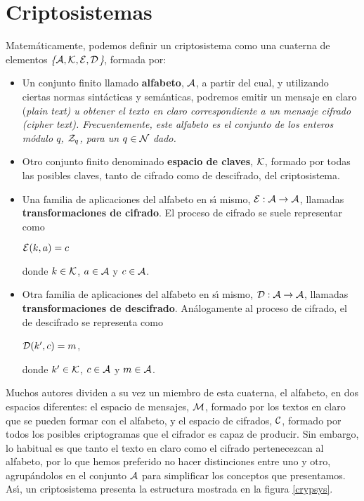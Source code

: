 \section{Criptosistemas}
Matem\'aticamente, podemos definir un criptosistema como una cuaterna
de elementos {\it\{$\cal A,K,E,D$\}}, formada por:
\begin{itemize}
\item{}Un conjunto finito llamado {\bf alfabeto}, $\cal A$, a partir del cual, 
y utilizando ciertas normas sin\-t\'ac\-ti\-cas y sem\'anticas, podremos emitir
un mensaje en claro (\it{plain text}\rm) u obtener el texto en claro 
correspondiente a un mensaje cifrado ({\it cipher text}). Frecuentemente, este 
alfabeto es el conjunto de los enteros m\'odulo $q$, ${\cal Z}_{q}$, para un 
$q\in{\cal N}$ dado.
\item{}Otro conjunto finito denominado {\bf espacio de claves}, $\cal K$, 
formado por todas las posibles claves, tanto de cifrado como de descifrado, del 
criptosistema.
\item{}Una familia de aplicaciones del alfabeto en s\'{\i} mismo, 
$\cal E:A\rightarrow A$, llamadas {\bf transformaciones de cifrado}. El proceso 
de cifrado se suele representar como
\begin{center} 
${\cal E}(k,a)=c$
\end{center}
donde $k\in{\cal K}$, $a\in{\cal A}$ y $c\in{\cal A}$.
\item{}Otra familia de aplicaciones del alfabeto en s\'{\i} mismo, 
$\cal D:A\rightarrow A$, llamadas {\bf transformaciones de descifrado}. 
An\'alogamente al proceso de cifrado, el de descifrado se representa como
\begin{center} 
${\cal D}(k^{\prime},c)=m$,
\end{center}
donde $k^{\prime}\in {\cal K}$, $c\in{\cal A}$ y $m\in{\cal A}$.
\end{itemize}
Muchos autores dividen a su vez un miembro de esta cuaterna, el alfabeto, en 
dos espacios di\-fe\-ren\-tes: el espacio de mensajes, $\cal M$, formado por 
los textos en claro que se pueden formar con el alfabeto, y el espacio de 
cifrados, $\cal C$, formado por todos los posibles criptogramas que el cifrador 
es capaz de producir. Sin embargo, lo habitual es que tanto el texto en claro 
como el cifrado pertenecezcan al alfabeto, por lo que hemos 
preferido no hacer distinciones entre uno y otro, agrup\'andolos en el conjunto 
$\cal A$ para simplificar los conceptos que presentamos. As\'{\i}, un 
criptosistema presenta la estructura mostrada en la figura \ref{crypsys}.\\
